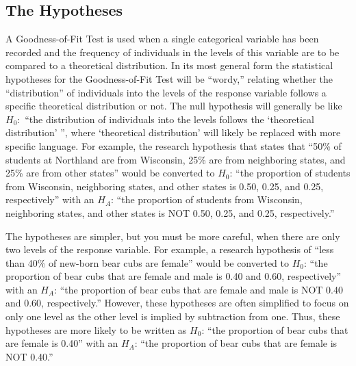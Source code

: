 \documentclass[10pt,openany]{book}\usepackage[]{graphicx}\usepackage[]{color}
\begin{document}
\subsection{The Hypotheses}
A Goodness-of-Fit Test is used when a single categorical variable has been recorded and the frequency of individuals in the levels of this variable are to be compared to a theoretical distribution. In its most general form the statistical hypotheses for the Goodness-of-Fit Test will be ``wordy,'' relating whether the ``distribution'' of individuals into the levels of the response variable follows a specific theoretical distribution or not. The null hypothesis will generally be like $H_{0}:$ ``the distribution of individuals into the levels follows the `theoretical distribution' '', where `theoretical distribution' will likely be replaced with more specific language. For example, the research hypothesis that states that ``50\% of students at Northland are from Wisconsin, 25\% are from neighboring states, and 25\% are from other states'' would be converted to $H_{0}$: ``the proportion of students from Wisconsin, neighboring states, and other states is 0.50, 0.25, and 0.25, respectively'' with an $H_{A}$: ``the proportion of students from Wisconsin, neighboring states, and other states is NOT 0.50, 0.25, and 0.25, respectively.''


The hypotheses are simpler, but you must be more careful, when there are only two levels of the response variable. For example, a research hypothesis of ``less than 40\% of new-born bear cubs are female'' would be converted to $H_{0}$: ``the proportion of bear cubs that are female and male is 0.40 and 0.60, respectively'' with an $H_{A}$: ``the proportion of bear cubs that are female and male is NOT 0.40 and 0.60, respectively.''  However, these hypotheses are often simplified to focus on only one level as the other level is implied by subtraction from one. Thus, these hypotheses are more likely to be written as $H_{0}$: ``the proportion of bear cubs that are female is 0.40'' with an $H_{A}$: ``the proportion of bear cubs that are female is NOT 0.40.''

\end{document}
